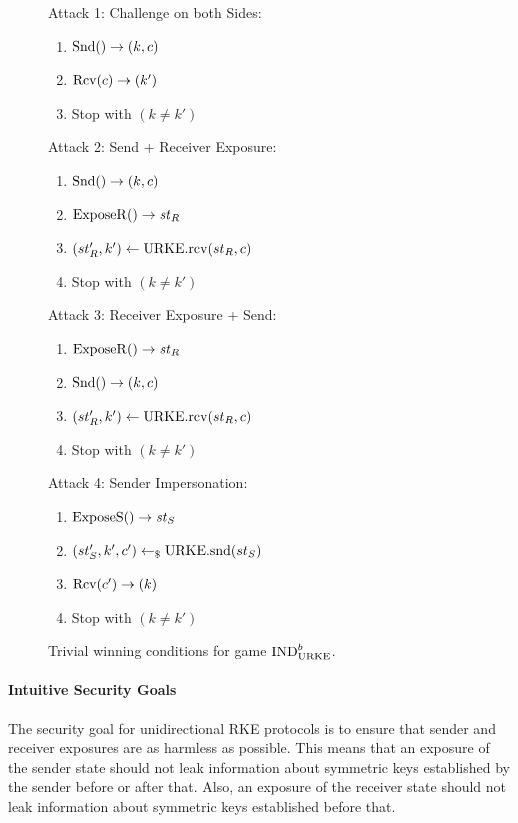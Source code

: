 \begin{figure}[!ht]
    \centering
    \begin{minipage}[t]{.5\textwidth}
        Attack 1: Challenge on both Sides:
        \begin{enumerate}[topsep=\smallskipamount]
            \item $\mathrm{Snd}()\to(k,c)$
            \item $\mathrm{Rcv}(c)\to(k')$
            \item Stop with $(k\neq k')$
        \end{enumerate}
        \medskip
        Attack 2: Send + Receiver Exposure:
        \begin{enumerate}[topsep=\smallskipamount]
            \item $\mathrm{Snd}()\to(k,c)$
            \item $\mathrm{ExposeR}()\to\mathit{st}_R$
            \item $(st_R', k')\gets\mathrm{URKE}.\mathrm{rcv}(st_R, c)$
            \item Stop with $(k\neq k')$
        \end{enumerate}
    \end{minipage}\hfill%
    \begin{minipage}[t]{.5\textwidth}
        Attack 3: Receiver Exposure + Send:
        \begin{enumerate}[topsep=\smallskipamount]
            \item $\mathrm{ExposeR}()\to\mathit{st}_R$
            \item $\mathrm{Snd}()\to(k,c)$
            \item $(st_R', k')\gets\mathrm{URKE}.\mathrm{rcv}(st_R, c)$
            \item Stop with $(k\neq k')$
        \end{enumerate}
        \medskip
        Attack 4: Sender Impersonation:
        \begin{enumerate}[topsep=\smallskipamount]
            \item $\mathrm{ExposeS}()\to\mathit{st}_S$
            \item $(st_S', k', c')\gets_\$\mathrm{URKE}.\mathrm{snd}(st_S)$
            \item $\mathrm{Rcv}(c')\to(k)$
            \item Stop with $(k\neq k')$
        \end{enumerate}
    \end{minipage}
    \caption{Trivial winning conditions for game ${\mathrm{IND}}_{\mathrm{URKE}}^b$.}
    \label{fig:urke:trivial}
\end{figure}

\paragraph{Intuitive Security Goals} The security goal for unidirectional RKE protocols is to ensure that sender and receiver exposures are as harmless as possible.
This means that an exposure of the sender state should not leak information about symmetric keys established by the sender before or after that.
Also, an exposure of the receiver state should not leak information about symmetric keys established before that.

